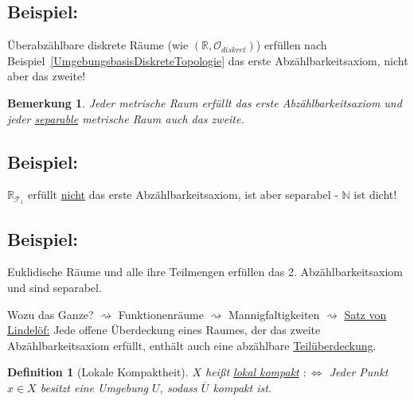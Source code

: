 \documentclass[a4paper,11pt,notitlepage]{report}
\newtheorem{definition}{Definition}[chapter]
\newtheorem{remark}{Bemerkung}[chapter]
\newcommand{\R}{{\ensuremath{\mathbb{R}}}}
\newcommand{\N}{{\ensuremath{\mathbb{N}}}}
\newcommand{\OO}{{\ensuremath{\mathcal{O}}}}
\newenvironment{bsp}[1]
{
\setlength{\fboxsep}{10pt}
\subsection*{Beispiel: #1}
\begin{upshape}
}
{
\end{upshape}
}
\begin{document}
\begin{bsp}{}
	Überabzählbare diskrete Räume (wie $(\R, \OO_{diskret})$) erfüllen nach Beispiel~\ref{UmgebungsbasisDiskreteTopologie} das erste Abzählbarkeitsaxiom, nicht aber das zweite!
\end{bsp}
 
\begin{remark}
	Jeder metrische Raum erfüllt das erste Abzählbarkeitsaxiom und jeder \underline{separable} metrische Raum auch das zweite.
\end{remark} 
 
\begin{bsp}{}
	$\R_{\mathcal{T}_1}$ erfüllt \underline{nicht} das erste Abzählbarkeitsaxiom, ist aber separabel - $\N$ ist dicht!
\end{bsp} 
 
\begin{bsp}{}
	Euklidische Räume und alle ihre Teilmengen erfüllen das 2. Abzählbarkeitsaxiom und sind separabel.
\end{bsp} 
 
Wozu das Ganze? 
\newline $\rightsquigarrow$ Funktionenräume
\newline $\rightsquigarrow$ Mannigfaltigkeiten
\newline $\rightsquigarrow$ \underline{Satz von Lindelöf:}
Jede offene Überdeckung eines Raumes, der das zweite Abzählbarkeitsaxiom erfüllt, enthält auch eine abzählbare \underline{Teilüberdeckung}.
 
\begin{definition}[Lokale Kompaktheit]
$X$ heißt \underline{\underline{lokal} kompakt} \newline $:\Leftrightarrow$ Jeder Punkt $x \in X$ besitzt eine Umgebung $U$, sodass $\overline{U}$ kompakt ist.
\end{definition} 
\end{document}

